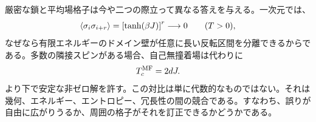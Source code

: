 厳密な鎖と平均場格子は今や二つの際立って異なる答えを与える。一次元では、
\begin{equation}
\left\langle\sigma_i\sigma_{i+r}\right\rangle
=\left[\tanh(\beta J)\right]^r
\longrightarrow0
\qquad (T>0),
\end{equation}
なぜなら有限エネルギーのドメイン壁が任意に長い反転区間を分離できるからである。多数の隣接スピンがある場合、自己無撞着場は代わりに
\begin{equation}
T_c^{\rm MF}=2dJ.
\end{equation}
より下で安定な非ゼロ解を許す。この対比は単に代数的なものではない。それは幾何、エネルギー、エントロピー、冗長性の間の競合である。すなわち、誤りが自由に広がりうるか、周囲の格子がそれを訂正できるかどうかである。